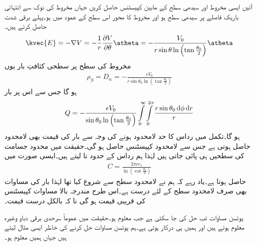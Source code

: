 آئیں ایسی مخروط اور سیدھی سطح کے مابین کپیسٹنس حاصل کریں جہاں مخروط کی نوک سے انتہائی باریک فاصلے پر سیدھی سطح ہو اور مخروط کا محور اس سطح کے عمود میں ہو۔پہلے برقی شدت حاصل کرتے ہیں۔
\begin{align}
\kvec{E}=-\nabla V=-\frac{1}{r} \frac{\partial V}{\partial \theta} \atheta=-\frac{V_0}{r \sin \theta  \ln \left (\tan \frac{\theta_0}{2} \right)} \atheta
\end{align}
مخروط کی سطح پر سطحی کثافتِ بار یوں
\begin{align*}
\rho_S=D_n=-\frac{\epsilon V_0}{r \sin \theta_0  \ln \left (\tan \frac{\theta_0}{2} \right)}
\end{align*}
ہو گا جس سے اس پر بار
\begin{align*}
Q=-\frac{\epsilon V_0}{\sin \theta_0  \ln \left (\tan \frac{\theta_0}{2} \right)}\int \limits_0^\infty \int \limits_0^{2\pi}\frac{r \sin \theta_0 \dif \phi \dif r}{r}
\end{align*}
ہو گا۔تکمل میں رداس کا حد لامحدود ہونے کی وجہ سے بار کی قیمت بھی لامحدود حاصل ہوتی ہے جس سے لامحدود کپیسٹنس حاصل ہو گی۔حقیقت میں محدود جسامت کی سطحیں ہی پائی جاتی ہیں لہٰذا ہم رداس کے حدود  تا  لیتے ہیں۔ایسی صورت میں
\begin{align}\label{مساوات_لاپلاس_مخروطی_کپیسٹنس}
C=\frac{2\pi \epsilon r_1}{\ln \left(\cot \frac{\theta_0}{2} \right)}
\end{align}
حاصل ہوتا ہے۔یاد رہے کہ ہم نے لامحدود سطح سے شروع کیا تھا لہٰذا بار کی مساوات بھی صرف لامحدود سطح کے لئے درست ہے۔اس طرح مندرجہ بالا مساوات کپیسٹنس کی قریبی قیمت ہو گی نا کہ بالکل درست قیمت۔ 

پوئسن مساوات تب حل کی جا سکتی ہے جب  معلوم ہو۔حقیقت میں عموماً سرحدی برقی دباو وغیرہ معلوم ہوتے ہیں اور ہمیں  ہی درکار ہوتی ہے۔ہم پوئسن مساوات حل کرنے کی خاطر ایسی مثال لیتے ہیں جہاں ہمیں  معلوم ہو۔

